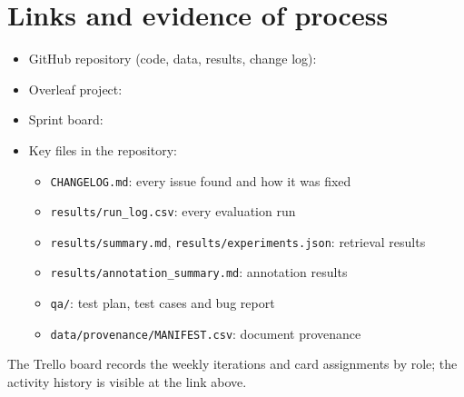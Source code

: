 
\section{Links and evidence of process}\label{app:links}
\begin{itemize}
  \item GitHub repository (code, data, results, change log): \githuburl
  \item Overleaf project: \overleafurl
  \item Sprint board: \boardurl
  \item Key files in the repository:
  \begin{itemize}
    \item \texttt{CHANGELOG.md}: every issue found and how it was fixed
    \item \texttt{results/run\_log.csv}: every evaluation run
    \item \texttt{results/summary.md}, \texttt{results/experiments.json}: retrieval results
    \item \texttt{results/annotation\_summary.md}: annotation results
    \item \texttt{qa/}: test plan, test cases and bug report
    \item \texttt{data/provenance/MANIFEST.csv}: document provenance
  \end{itemize}
\end{itemize}
The Trello board records the weekly iterations and card assignments by role; the activity history is visible at the link above.

